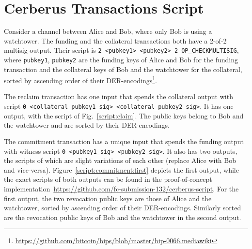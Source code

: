 \documentclass[runningheads]{llncs}
\begin{document}
\section{Cerberus Transactions Script}
\label{sec:script}

Consider a channel between Alice and Bob, where only Bob is using a watchtower.
The funding and the collateral transactions both have a 2-of-2 multisig output. Their script is
\texttt{2 <pubkey1> <pubkey2> 2 OP\_CHECKMULTISIG},
where \texttt{pubkey1}, \texttt{pubkey2} are the funding keys of Alice and Bob for the funding transaction and the collateral keys of Bob and the watchtower for the collateral, sorted by ascending order of their DER-encodings\footnote{\url{https://github.com/bitcoin/bips/blob/master/bip-0066.mediawiki}}.

The reclaim transaction has one input that spends the collateral output with script
\texttt{0 <collateral\_pubkey1\_sig> <collateral\_pubkey2\_sig>}.
It has one output, with the script of Fig.~\ref{script:claim}. The public keys belong to Bob and the watchtower and are sorted by their DER-encodings.


The commitment transaction has a unique input that spends the funding output with witness script \texttt{0 <pubkey1\_sig> <pubkey2\_sig>}. It also has two outputs, the scripts of which are slight variations of each other (replace Alice with Bob and vice-versa). Figure~\ref{script:commitment:first} depicts the first output, while
the exact scripts of both outputs can be found in the proof-of-concept implementation~\url{https://github.com/fc-submission-132/cerberus-script}.
For the first output, the two revocation public keys are those of Alice and the watchtower, sorted by ascending order of their DER-encodings. Similarly sorted are the revocation public keys of Bob and the watchtower in the second output.
\end{document}
